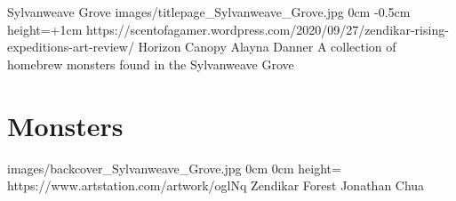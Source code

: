 \documentclass[letterpaper,openany,twoside,twocolumn]{book}
\begin{document}
	\bookTitlePage
		{Sylvanweave Grove}
		{images/titlepage_Sylvanweave_Grove.jpg}
		{0cm}
		{-0.5cm}
		{height=\paperheight+1cm}
		{https://scentofagamer.wordpress.com/2020/09/27/zendikar-rising-expeditions-art-review/}
		{Horizon Canopy}
		{Alayna Danner}
		{A collection of homebrew monsters found in the Sylvanweave Grove}
	
	\tableofcontents
	
	\mainmatter
	
	\MonsterSheetGeometry
	\part{Monsters}
	
	
	\bookLastPage
		{images/backcover_Sylvanweave_Grove.jpg}
		{0cm}
		{0cm}
		{height=\paperheight}
		{https://www.artstation.com/artwork/oglNq}
		{Zendikar Forest}
		{Jonathan Chua}
		{}
\end{document}
